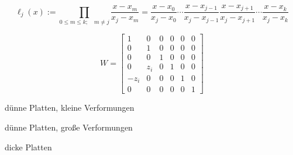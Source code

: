 \begin{equation}
  \ell
  _{j}(x):= \prod
  _{0 \leq m \leq k; \quad m \neq j}\frac{x - x_m}{x_j - x_m}= \frac
  {x - x_0}{x_j - x_0}\cdots \frac
  {x -
    x_{j - 1}}{x_j -
    x_{j - 1}}\frac
  {x -
    x_{j + 1}}{x_j -
    x_{j + 1}}\cdots \frac
  {x - x_k}{x_j - x_k}
\end{equation}

\begin{equation}
  W =
  \begin{bmatrix}
    1 & 0 & 0 & 0 & 0 & 0 \\ 0 & 1 & 0 & 0 & 0 & 0 \\ 0 & 0 & 1 & 0 & 0 & 0 \\ 0 & z_i   & 0 & 1 & 0 & 0         \\ -z_i    & 0 & 0 & 0 & 1 & 0 \\ 0 & 0 & 0 & 0 & 0 & 1
  \end{bmatrix}
\end{equation}

\begin{itemize*}
  \item dünne Platten, kleine Verformungen \item dünne Platten, große Verformungen \item dicke Platten
\end{itemize*}
